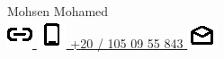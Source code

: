 {
  \noindent
  \fontsize{27pt}{27pt}\blackColor\optifont
  Mohsen Mohamed
} \\
%
\href{https://\domain}{
  \includegraphics[align=c]{assets/icons/url.eps}
  \quad\domain
}
%
\quad\quad
\href{tel:+201050955843}{
  \includegraphics[align=c]{assets/icons/phone.eps}
  \enspace +20 / 105 09 55 843
}
%
\quad\quad
\href{mailto:\email}{
  \includegraphics[align=c]{assets/icons/email.eps}
  \enspace\email
}
